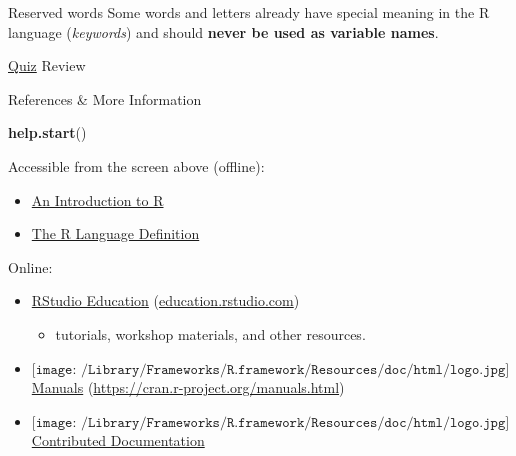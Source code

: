 \documentclass[
  ignorenonframetext,
]{beamer}
\newenvironment{Shaded}{\begin{snugshade}}{\end{snugshade}}
\newcommand{\FunctionTok}[1]{\textcolor[rgb]{0.13,0.29,0.53}{\textbf{#1}}}
\newcommand{\NormalTok}[1]{#1}
\providecommand{\tightlist}{%
  \setlength{\itemsep}{0pt}\setlength{\parskip}{0pt}}
\begin{document}
\begin{frame}{Reserved words}
\protect\hypertarget{reserved-words}{}
Some words and letters already have special meaning in the R language
(\emph{keywords}) and should \textbf{never be used as variable names}.
\end{frame}

\begin{frame}[fragile]{\protect\hyperlink{pop-quiz}{Quiz} Review}
\protect\hypertarget{quiz-review}{}
\end{frame}

\begin{frame}[fragile]{References \& More Information}
\protect\hypertarget{references-more-information}{}
\begin{Shaded}
\begin{Highlighting}[]
\FunctionTok{help.start}\NormalTok{()}
\end{Highlighting}
\end{Shaded}

Accessible from the screen above (offline):

\begin{itemize}
\tightlist
\item
  \href{https://cran.r-project.org/doc/manuals/r-release/R-intro.html}{An
  Introduction to R}
\item
  \href{https://cran.r-project.org/doc/manuals/r-release/R-lang.html}{The
  R Language Definition}
\end{itemize}

Online:

\begin{itemize}
\tightlist
\item
  \href{https://education.rstudio.com/}{RStudio Education}
  (\href{https://education.rstudio.com/}{education.rstudio.com})

  \begin{itemize}
  \tightlist
  \item
    tutorials, workshop materials, and other resources.
  \end{itemize}
\item
  \(\texttt{[image: /Library/Frameworks/R.framework/Resources/doc/html/logo.jpg]}\)
  \href{https://cran.r-project.org/manuals.html}{Manuals}
  (\url{https://cran.r-project.org/manuals.html})
\item
  \(\texttt{[image: /Library/Frameworks/R.framework/Resources/doc/html/logo.jpg]}\)
  \href{https://cran.r-project.org/other-docs.html}{Contributed
  Documentation}


\end{itemize}
\end{frame}
\end{document}
